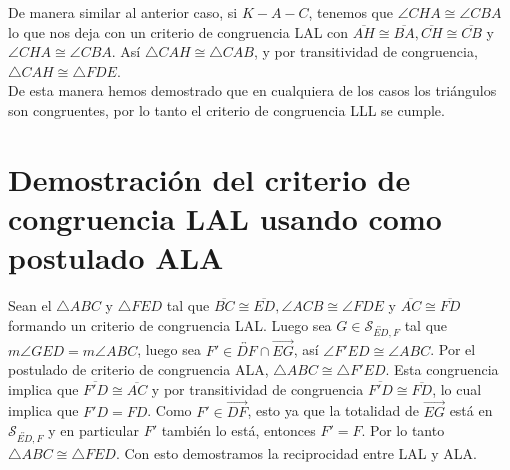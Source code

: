 \documentclass{report}
\begin{document}
    De manera similar al anterior caso, si $K - A - C$, tenemos que $\angle CHA \cong \angle CBA$ lo que nos deja con un criterio de congruencia LAL con $\overline{AH} \cong \overline{BA}, \overline{CH} \cong \overline{CB}$ y $\angle CHA \cong \angle CBA$. Así $\triangle CAH \cong \triangle CAB$, y por transitividad de congruencia, $\triangle CAH \cong \triangle FDE$.\\

    De esta manera hemos demostrado que en cualquiera de los casos los triángulos son congruentes, por lo tanto el criterio de congruencia LLL se cumple.

    \section{Demostración del criterio de congruencia LAL usando como postulado ALA}

    Sean el $\triangle ABC$ y $\triangle FED$ tal que $\overline{BC} \cong \overline{ED}, \angle ACB \cong \angle FDE$ y $ \overline{AC} \cong \overline{FD}$ formando un criterio de congruencia LAL. Luego sea $G \in \mathcal{S}_{\overleftrightarrow{ED}, F}$ tal que $m\angle GED = m\angle ABC$, luego sea $F' \in \overleftrightarrow{DF} \cap \overrightarrow{EG}$, así $\angle F'ED \cong \angle ABC$. Por el postulado de criterio de congruencia ALA, $\triangle ABC \cong \triangle F'ED$. Esta congruencia implica que $\overline{F'D} \cong \overline{AC}$ y por transitividad de congruencia $\overline{F'D} \cong \overline{FD}$, lo cual implica que $F'D = FD$. Como $F' \in \overrightarrow{DF}$, esto ya que la totalidad de $\overrightarrow{EG}$ está en $\mathcal{S}_{\overleftrightarrow{ED}, F}$ y en particular $F'$ también lo está, entonces $F' = F$. Por lo tanto $\triangle ABC \cong \triangle FED$. Con esto demostramos la reciprocidad entre LAL y ALA.
\end{document}
